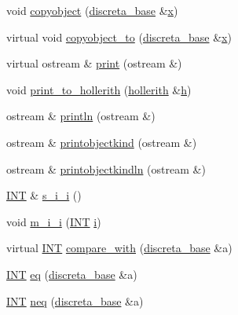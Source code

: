 \begin{DoxyCompactItemize}
void \mbox{\hyperlink{classdiscreta__base_a68fac2b12cefae0bc4d1a41faf9bc862}{copyobject}} (\mbox{\hyperlink{classdiscreta__base}{discreta\+\_\+base}} \&\mbox{\hyperlink{alphabet2_8_c_a6150e0515f7202e2fb518f7206ed97dc}{x}})
\item 
virtual void \mbox{\hyperlink{classdiscreta__base_a33180628d9ced231267229b3564790f3}{copyobject\+\_\+to}} (\mbox{\hyperlink{classdiscreta__base}{discreta\+\_\+base}} \&\mbox{\hyperlink{alphabet2_8_c_a6150e0515f7202e2fb518f7206ed97dc}{x}})
\item 
virtual ostream \& \mbox{\hyperlink{classdiscreta__base_a036e48bc058347046fc9b73dd0951478}{print}} (ostream \&)
\item 
void \mbox{\hyperlink{classdiscreta__base_aa0c0ba64fdeef1b76df143048bca47ea}{print\+\_\+to\+\_\+hollerith}} (\mbox{\hyperlink{classhollerith}{hollerith}} \&\mbox{\hyperlink{alphabet2_8_c_a16611451551e3d15916bae723c3f59f7}{h}})
\item 
ostream \& \mbox{\hyperlink{classdiscreta__base_a9f021788626eb6e6622142a0f3494727}{println}} (ostream \&)
\item 
ostream \& \mbox{\hyperlink{classdiscreta__base_aa75a1314aa706909b029664944904231}{printobjectkind}} (ostream \&)
\item 
ostream \& \mbox{\hyperlink{classdiscreta__base_a677ccc8f392ebedde05e453f8cf59559}{printobjectkindln}} (ostream \&)
\item 
\mbox{\hyperlink{galois_8h_a09fddde158a3a20bd2dcadb609de11dc}{I\+NT}} \& \mbox{\hyperlink{classdiscreta__base_aadb92c01fbe69b3034b0214b33fbc735}{s\+\_\+i\+\_\+i}} ()
\item 
void \mbox{\hyperlink{classdiscreta__base_aa231464a9d4bc233f66608021c9ad997}{m\+\_\+i\+\_\+i}} (\mbox{\hyperlink{galois_8h_a09fddde158a3a20bd2dcadb609de11dc}{I\+NT}} \mbox{\hyperlink{alphabet2_8_c_acb559820d9ca11295b4500f179ef6392}{i}})
\item 
virtual \mbox{\hyperlink{galois_8h_a09fddde158a3a20bd2dcadb609de11dc}{I\+NT}} \mbox{\hyperlink{classdiscreta__base_a3818444c4301d0b7ed47c3b850ea6c60}{compare\+\_\+with}} (\mbox{\hyperlink{classdiscreta__base}{discreta\+\_\+base}} \&a)
\item 
\mbox{\hyperlink{galois_8h_a09fddde158a3a20bd2dcadb609de11dc}{I\+NT}} \mbox{\hyperlink{classdiscreta__base_a7afe4f013b04efa764ed9fe099e5eb80}{eq}} (\mbox{\hyperlink{classdiscreta__base}{discreta\+\_\+base}} \&a)
\item 
\mbox{\hyperlink{galois_8h_a09fddde158a3a20bd2dcadb609de11dc}{I\+NT}} \mbox{\hyperlink{classdiscreta__base_a42975aaa9bb0b76d468df7fdb9390251}{neq}} (\mbox{\hyperlink{classdiscreta__base}{discreta\+\_\+base}} \&a)

\end{DoxyCompactItemize}
